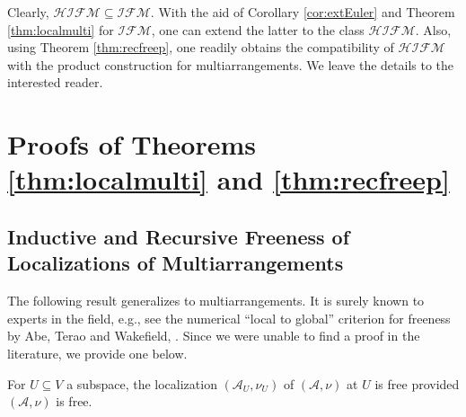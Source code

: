 Clearly, ${{\mathcal {HIFM}}} \subseteq {{\mathcal {IFM}}}$.
With the aid of Corollary \ref{cor:extEuler}
and Theorem \ref{thm:localmulti} for ${{\mathcal {IFM}}}$, 
one can extend the latter to the class ${{\mathcal {HIFM}}}$.
Also, using Theorem \ref{thm:recfreep},  
one readily obtains the compatibility of 
${{\mathcal {HIFM}}}$ with 
the product construction for multiarrangements.
We leave the details to the interested reader.

\section{Proofs of Theorems \ref{thm:localmulti}
and \ref{thm:recfreep}}

\subsection{Inductive and Recursive Freeness of Localizations of Multiarrangements}
\label{ssec:localizations}
The following result 
generalizes \cite[Prop.\ 2]{terao:freefinitefields} to multiarrangements.
It is surely known to experts in the field, e.g.,
see the numerical ``local to global'' criterion for freeness by 
Abe, Terao and Wakefield, 
\cite[Cor.\ 4.6]{abeteraowakefield:characteristic}.
Since we were unable to find a proof in the literature,
we provide one below. 

\begin{theorem}
\label{thm:multi}
For $U \subseteq V$ a subspace, the 
localization $({{\mathcal A}}_U, \nu_U)$ of $({{\mathcal A}}, \nu)$ at $U$ is free 
provided $({{\mathcal A}}, \nu)$ is free.
\end{theorem}

